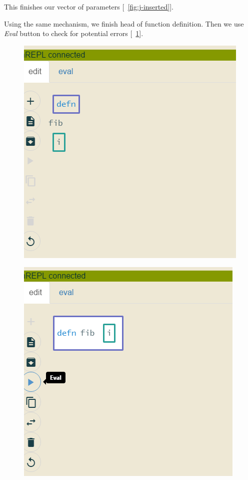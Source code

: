 \documentclass[11pt]{scrartcl}
\newcommand*{\figref}[1]{[\textbf{\figurename}~\ref{#1}]}
\begin{document}
This finishes our vector of parameters \figref{fig:j-inserted}.

Using the same mechanism, we finish head of function definition. Then we use
\textit{Eval}  button to check for potential errors \figref{fig:j-defn-eval}.

\begin{figure}[hbt]
  \centering
  \begin{minipage}{0.48\textwidth}
    \centering
    \includegraphics[scale=0.3]{img/j-inserted}
\label{fig:j-inserted}
  \end{minipage}
  \begin{minipage}{0.48\textwidth}
    \centering
    \includegraphics[scale=0.3]{img/j-defn-eval}
\label{fig:j-defn-eval}
  \end{minipage}
\end{figure}
\end{document}
